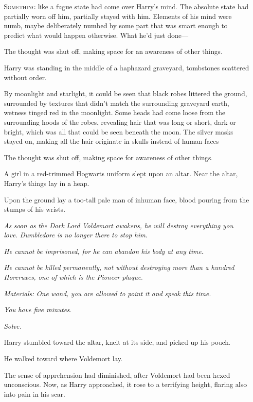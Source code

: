 
\lettrine{S}{omething} like a fugue state had come over Harry's mind. The absolute state had
partially worn off him, partially stayed with him. Elements of his mind were
numb, maybe deliberately numbed by some part that was smart enough to predict
what would happen otherwise. What he'd just done\mbox{---}

The thought was shut off, making space for an awareness of other things.

Harry was standing in the middle of a haphazard graveyard, tombstones scattered
without order.

By moonlight and starlight, it could be seen that black robes littered the
ground, surrounded by textures that didn't match the surrounding graveyard
earth, wetness tinged red in the moonlight. Some heads had come loose from the
surrounding hoods of the robes, revealing hair that was long or short, dark or
bright, which was all that could be seen beneath the moon. The silver masks
stayed on, making all the hair originate in skulls instead of human faces\mbox{---}

The thought was shut off, making space for awareness of other things.

A girl in a red-trimmed Hogwarts uniform slept upon an altar. Near the altar,
Harry's things lay in a heap.

Upon the ground lay a too-tall pale man of inhuman face, blood pouring from the
stumps of his wrists.

\emph{As soon as the Dark Lord Voldemort awakens, he will destroy everything
you love. Dumbledore is no longer there to stop him.}

\emph{He cannot be imprisoned, for he can abandon his body at any time.}

\emph{He cannot be killed permanently, not without destroying more than a
hundred Horcruxes, one of which is the Pioneer plaque.}

\emph{Materials: One wand, you are allowed to point it and speak this time.}

\emph{You have five minutes.}

\emph{Solve.}

Harry stumbled toward the altar, knelt at its side, and picked up his pouch.

He walked toward where Voldemort lay.

The sense of apprehension had diminished, after Voldemort had been hexed
unconscious. Now, as Harry approached, it rose to a terrifying height, flaring
also into pain in his scar.


